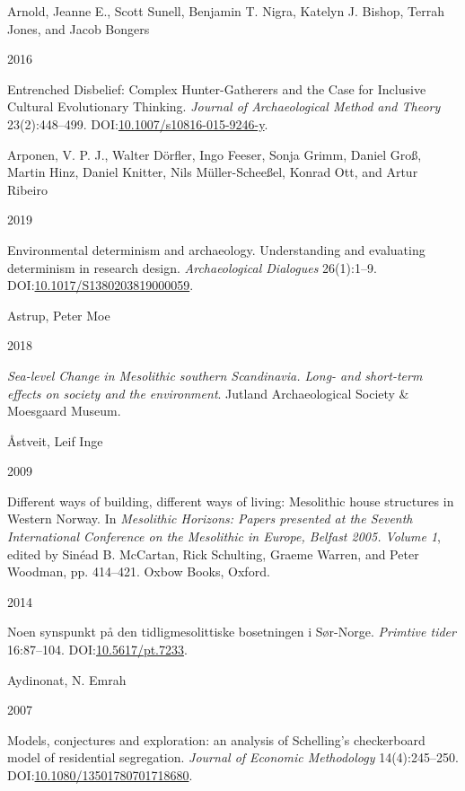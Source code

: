 \documentclass[
  12pt,
  a4paper,
  oneside]{book}
\newlength{\cslhangindent}
\newlength{\csllabelwidth}
\newlength{\cslentryspacingunit} %
\newenvironment{CSLReferences}[2] %
 {%
  \setlength{\parindent}{0pt}
  \ifodd #1
  \let\oldpar\par
  \def\par{\hangindent=\cslhangindent\oldpar}
  \fi
  \setlength{\parskip}{#2\cslentryspacingunit}
 }%
 {}
\newcommand{\CSLBlock}[1]{#1\hfill\break}
\newcommand{\CSLLeftMargin}[1]{\parbox[t]{\csllabelwidth}{#1}}
\newcommand{\CSLRightInline}[1]{\parbox[t]{\linewidth - \csllabelwidth}{#1}\break}
\begin{document}
\begin{CSLReferences}{0}{0}
\leavevmode{}%
\CSLBlock{Arnold, Jeanne E., Scott Sunell, Benjamin T. Nigra, Katelyn J. Bishop, Terrah Jones, and Jacob Bongers}
\CSLLeftMargin{ 2016}
\CSLRightInline{{Entrenched Disbelief: Complex Hunter-Gatherers and the Case for Inclusive Cultural Evolutionary Thinking}. \emph{Journal of Archaeological Method and Theory} 23(2):448--499. DOI:\href{https://doi.org/10.1007/s10816-015-9246-y}{10.1007/s10816-015-9246-y}.}

\leavevmode{}%
\CSLBlock{Arponen, V. P. J., Walter Dörfler, Ingo Feeser, Sonja Grimm, Daniel Groß, Martin Hinz, Daniel Knitter, Nils Müller-Scheeßel, Konrad Ott, and Artur Ribeiro}
\CSLLeftMargin{ 2019}
\CSLRightInline{{Environmental determinism and archaeology. Understanding and evaluating determinism in research design}. \emph{Archaeological Dialogues} 26(1):1--9. DOI:\href{https://doi.org/10.1017/S1380203819000059}{10.1017/S1380203819000059}.}

\leavevmode{}%
\CSLBlock{Astrup, Peter Moe}
\CSLLeftMargin{ 2018}
\CSLRightInline{\emph{{Sea-level Change in Mesolithic southern Scandinavia. Long- and short-term effects on society and the environment}}. Jutland Archaeological Society \& Moesgaard Museum.}

\leavevmode{}%
\CSLBlock{Åstveit, Leif Inge}
\CSLLeftMargin{ 2009}
\CSLRightInline{{Different ways of building, different ways of living: Mesolithic house structures in Western Norway}. In \emph{{Mesolithic Horizons: Papers presented at the Seventh International Conference on the Mesolithic in Europe, Belfast 2005. Volume 1}}, edited by Sinéad B. McCartan, Rick Schulting, Graeme Warren, and Peter Woodman, pp. 414--421. Oxbow Books, Oxford.}

\leavevmode{}%
\CSLLeftMargin{ 2014 }
\CSLRightInline{{Noen synspunkt på den tidligmesolittiske bosetningen i Sør-Norge}. \emph{Primtive tider} 16:87--104. DOI:\href{https://doi.org/10.5617/pt.7233}{10.5617/pt.7233}.}

\leavevmode{}%
\CSLBlock{Aydinonat, N. Emrah}
\CSLLeftMargin{ 2007}
\CSLRightInline{{Models, conjectures and exploration: an analysis of Schelling's checkerboard model of residential segregation}. \emph{Journal of Economic Methodology} 14(4):245--250. DOI:\href{https://doi.org/10.1080/13501780701718680}{10.1080/13501780701718680}.}


\end{CSLReferences}
\end{document}
